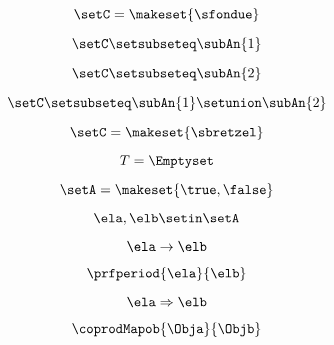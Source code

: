 {\begin{forslides}
    \begin{equation}
        \label{eq:feedback-074}
        \setC = \makeset{ \sfondue }
    \end{equation}

    \begin{equation}
        \label{eq:feedback-075}
        \setC \setsubseteq \subAn{1}
    \end{equation}

    \begin{equation}
        \label{eq:feedback-076}
        \setC \setsubseteq \subAn{2}
    \end{equation}

    \begin{equation}
        \label{eq:feedback-077}
        \setC \setsubseteq \subAn{1} \setunion \subAn{2}
    \end{equation}

    \begin{equation}
        \label{eq:feedback-078}
        \setC = \makeset{ \sbretzel }
    \end{equation}

    \begin{equation}
        \label{eq:feedback-079}
        T = \Emptyset
    \end{equation}

    \begin{equation}
        \label{eq:feedback-080}
        \setA = \makeset{ \true, \false }
    \end{equation}

    \begin{equation}
        \label{eq:feedback-081}
        \ela, \elb \setin \setA
    \end{equation}

    \begin{equation}
        \label{eq:feedback-082}
        \ela \to \elb
    \end{equation}

    \begin{equation}
        \label{eq:feedback-083}
        \prfperiod{\ela}{\elb}
    \end{equation}

    \begin{equation}
        \label{eq:feedback-084}
        \ela \Rightarrow \elb
    \end{equation}

    \begin{equation}
        \label{eq:feedback-085}
        \coprodMapob{\Obja}{\Objb}
    \end{equation}


\end{forslides}}

